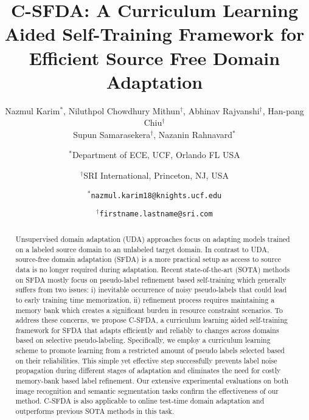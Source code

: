 \documentclass[10pt,twocolumn,letterpaper]{article}
\begin{document}
\title{C-SFDA: A Curriculum Learning Aided Self-Training Framework for Efficient Source Free Domain Adaptation}









\author{
Nazmul Karim$^{*}$,
Niluthpol Chowdhury Mithun$^{\dag}$,
Abhinav Rajvanshi$^{\dag}$,  Han-pang Chiu$^{\dag}$ \\ Supun Samarasekera$^{\dag}$,  Nazanin Rahnavard$^{*}$ \and
{\normalsize $^{*}$Department of ECE, UCF, Orlando FL USA} \and {\normalsize $^{\dag}$SRI International, Princeton, NJ, USA} 
\and
\texttt{\small $^{*}$nazmul.karim18@knights.ucf.edu} \and \texttt{\small $^{\dag}$firstname.lastname@sri.com}
}

\maketitle

{ \renewcommand{\thefootnote}{\fnsymbol{footnote}}
}


\begin{abstract}


Unsupervised domain adaptation (UDA) approaches focus on adapting models trained on a labeled source domain to an unlabeled target domain. 
In contrast to UDA, source-free domain adaptation (SFDA) is a more practical setup as access to source data is no longer required during adaptation. Recent state-of-the-art (SOTA) methods on SFDA mostly focus on pseudo-label refinement based self-training which generally suffers from two issues: i) inevitable occurrence of noisy pseudo-labels that could lead to early training time memorization, ii) refinement process requires maintaining a memory bank which creates a significant burden in resource constraint scenarios. To address these concerns, we propose C-SFDA, a curriculum learning aided self-training framework for SFDA that adapts efficiently and reliably to changes across domains based on selective pseudo-labeling. Specifically, we employ a curriculum learning scheme to promote learning from a restricted amount of pseudo labels selected based on their reliabilities. This simple yet effective step successfully prevents label noise propagation during different stages of adaptation and eliminates the need for costly memory-bank based label refinement. Our extensive experimental evaluations on both image recognition and semantic segmentation tasks confirm the effectiveness of our method. C-SFDA is also applicable to online test-time domain adaptation and outperforms previous SOTA methods in this task.
\end{abstract}
\end{document}
